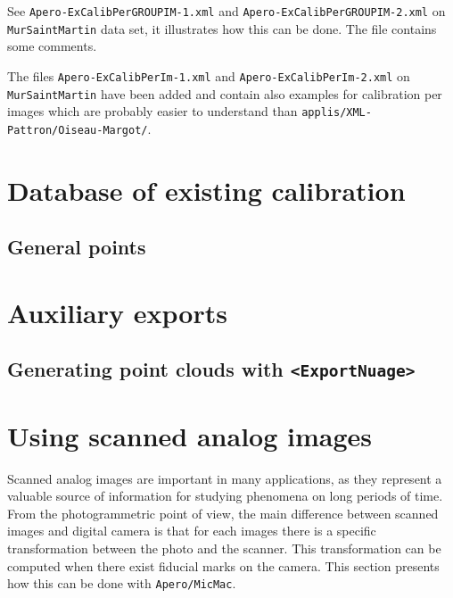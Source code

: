 See {\tt Apero-ExCalibPerGROUPIM-1.xml} and
{\tt Apero-ExCalibPerGROUPIM-2.xml}  on  {\tt MurSaintMartin} data
set, it illustrates how this can be done. The file contains
some comments.


The files {\tt Apero-ExCalibPerIm-1.xml} and {\tt Apero-ExCalibPerIm-2.xml}
on  {\tt MurSaintMartin} have been added and contain also
examples for calibration per images which are probably easier to understand
than {\tt  applis/XML-Pattron/Oiseau-Margot/}.


\section{Database of existing calibration}

\label{DB:Calib}
\subsection{General points}


\section{Auxiliary exports}


\subsection{Generating point clouds with {\tt <ExportNuage>}}

\label{Ap:Exp:Nuage}



\section{Using scanned analog images}

\label{Analog:Image}
Scanned analog images are important in many applications, as they represent
a valuable source of information for studying phenomena on long periods of time.
From the photogrammetric point of view, the main difference between
scanned images and digital camera is that for each images there
is a specific  transformation between the photo and the scanner.
This transformation can be computed when there exist fiducial marks
on the camera. This section presents how this can be done with {\tt Apero/MicMac}.


